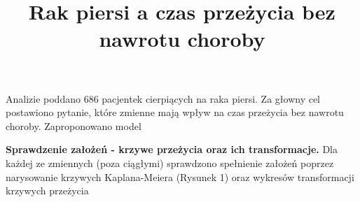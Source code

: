 \documentclass[]{article}
\title{Rak piersi a czas przeżycia bez nawrotu choroby}
\author{}
\date{}
\begin{document}
\maketitle


\thispagestyle{fancy}

Analizie poddano 686 pacjentek cierpiących na raka piersi. Za głowny cel
postawiono pytanie, które zmienne mają wpływ na czas przeżycia bez
nawrotu choroby. Zaproponowano model

\textbf{Sprawdzenie założeń - krzywe przeżycia oraz ich transformacje.}
\newline
Dla każdej ze zmiennych (poza ciągłymi) sprawdzono spełnienie założeń
poprzez narysowanie krzywych Kaplana-Meiera (Rysunek 1) oraz wykresów
transformacji  krzywych przeżycia
\end{document}
